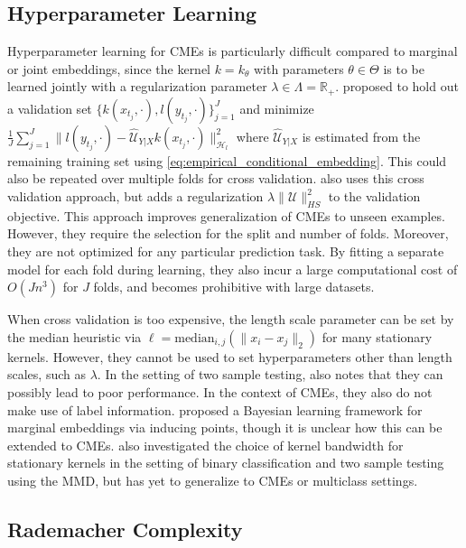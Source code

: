 \documentclass[twoside]{article}
\begin{document}
		\subsection{Hyperparameter Learning}
		
			Hyperparameter learning for \glspl{CME} is particularly difficult compared to marginal or joint embeddings, since the kernel $k = k_{\theta}$ with parameters $\theta \in \Theta$ is to be learned jointly with a regularization parameter $\lambda \in \Lambda = \mathbb{R}_{+}$. \cite{lever2012conditional} proposed to hold out a validation set $\{k(x_{t_{j}}, \cdot), l(y_{t_{j}}, \cdot)\}_{j = 1}^{J}$ and minimize $\frac{1}{J} \sum_{j = 1}^{J} \big\| l(y_{t_{j}}, \cdot) - \hat{\mathcal{U}}_{Y | X} k(x_{t_{j}}, \cdot) \big\|_{\mathcal{H}_{l}}^{2}$ where $\hat{\mathcal{U}}_{Y | X}$ is estimated from the remaining training set using \eqref{eq:empirical_conditional_embedding}. This could also be repeated over multiple folds for cross validation. \cite{song2013kernel} also uses this cross validation approach, but adds a regularization $\lambda \| \mathcal{U} \|^{2}_{HS}$ to the validation objective. This approach improves generalization of \glspl{CME} to unseen examples. However, they require the selection for the split and number of folds. Moreover, they are not optimized for any particular prediction task. By fitting a separate model for each fold during learning, they also incur a large computational cost of $O(J n^{3})$ for $J$ folds, and becomes prohibitive with large datasets.
			
			When cross validation is too expensive, the length scale parameter can be set by the median heuristic \citep{muandet2016kernel} via $\ell = \mathrm{median}_{i, j}(\| x_{i} - x_{j} \|_{2})$ for many stationary kernels. However, they cannot be used to set hyperparameters other than length scales, such as $\lambda$. In the setting of two sample testing, \cite{gretton2012optimal} also notes that they can possibly lead to poor performance. In the context of \glspl{CME}, they also do not make use of label information. \cite{flaxman2016bayesian} proposed a Bayesian learning framework for marginal embeddings via inducing points, though it is unclear how this can be extended to \glspl{CME}. \cite{fukumizu2009kernel} also investigated the choice of kernel bandwidth for stationary kernels in the setting of binary classification and two sample testing using the \gls{MMD}, but has yet to generalize to \glspl{CME} or multiclass settings.

		\subsection{Rademacher Complexity}
		
\end{document}
